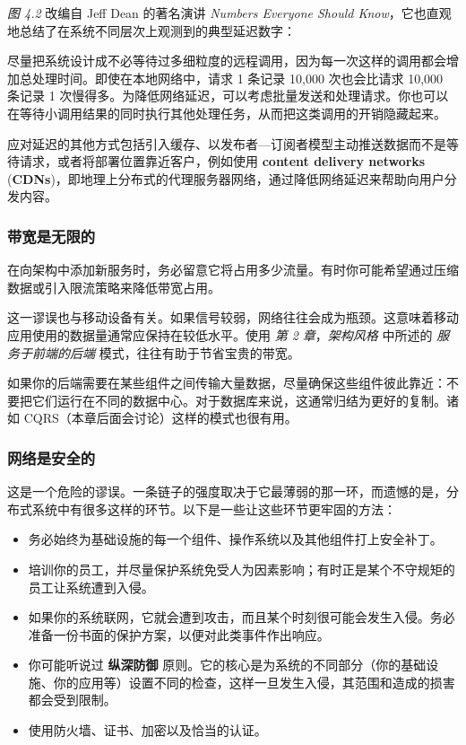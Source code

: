 \emph{图 4.2} 改编自 Jeff Dean 的著名演讲 \emph{Numbers Everyone Should Know}，它也直观地总结了在系统不同层次上观测到的典型延迟数字：


尽量把系统设计成不必等待过多细粒度的远程调用，因为每一次这样的调用都会增加总处理时间。即使在本地网络中，请求 1 条记录 10,000 次也会比请求 10,000 条记录 1 次慢得多。为降低网络延迟，可以考虑批量发送和处理请求。你也可以在等待小调用结果的同时执行其他处理任务，从而把这类调用的开销隐藏起来。

\label{idx:287}
\label{idx:288}
应对延迟的其他方式包括引入缓存、以发布者—订阅者模型主动推送数据而不是等待请求，或者将部署位置靠近客户，例如使用 \textbf{content delivery networks }(\textbf{CDNs})，即地理上分布式的代理服务器网络，通过降低网络延迟来帮助向用户分发内容。

\subsubsection{带宽是无限的}

在向架构中添加新服务时，务必留意它将占用多少流量。有时你可能希望通过压缩数据或引入限流策略来降低带宽占用。

这一谬误也与移动设备有关。如果信号较弱，网络往往会成为瓶颈。这意味着移动应用使用的数据量通常应保持在较低水平。使用 \emph{第 2 章}，\emph{架构风格} 中所述的 \emph{服务于前端的后端} 模式，往往有助于节省宝贵的带宽。

如果你的后端需要在某些组件之间传输大量数据，尽量确保这些组件彼此靠近：不要把它们运行在不同的数据中心。对于数据库来说，这通常归结为更好的复制。诸如 CQRS（本章后面会讨论）这样的模式也很有用。

\subsubsection{网络是安全的}

这是一个危险的谬误。一条链子的强度取决于它最薄弱的那一环，而遗憾的是，分布式系统中有很多这样的环节。以下是一些让这些环节更牢固的方法：

\begin{itemize}
\item 务必始终为基础设施的每一个组件、操作系统以及其他组件打上安全补丁。
\item 培训你的员工，并尽量保护系统免受人为因素影响；有时正是某个不守规矩的员工让系统遭到入侵。
\item 如果你的系统联网，它就会遭到攻击，而且某个时刻很可能会发生入侵。务必准备一份书面的保护方案，以便对此类事件作出响应。
\label{idx:289}
\item 你可能听说过 \textbf{纵深防御} 原则。它的核心是为系统的不同部分（你的基础设施、你的应用等）设置不同的检查，这样一旦发生入侵，其范围和造成的损害都会受到限制。
\item 使用防火墙、证书、加密以及恰当的认证。
\end{itemize}

